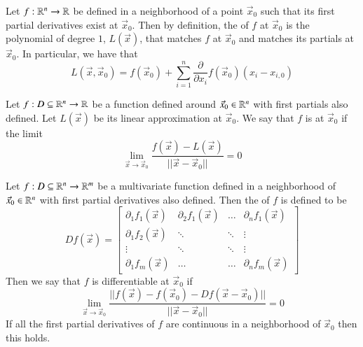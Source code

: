 \documentclass[12pt]{report}
\begin{document}
\begin{appendices}
    \begin{defn}{}{}
        Let $f:\mathbb R^n\rightarrow \mathbb R$ be defined in a neighborhood of a point $\vec{x}_0$ such that its first partial derivatives exist at $\vec{x}_0$. Then by definition, the  of $f$ at $\vec{x}_0$ is the polynomial of degree $1$, $L(\vec{x})$, that matches $f$ at $\vec{x}_0$ and matches its partials at $\vec{x}_0$. In particular, we have that \begin{equation}
            L(\vec{x},\vec{x}_0) = f(\vec{x}_0) + \sum_{i=1}^n \frac{\partial}{\partial x_i}f(\vec{x}_0)(x_i - x_{i,0})
        \end{equation}
    \end{defn}


    \begin{defn}{}{}
        Let $f:D\subseteq \mathbb R^n\rightarrow \mathbb R$ be a function defined around $\vec{x}_0 \in \mathbb R^n$ with first partials also defined. Let $L(\vec{x})$ be its linear approximation at $\vec{x}_0$. We say that $f$ is  at $\vec{x}_0$ if the limit \begin{equation}
            \lim_{\vec{x}\rightarrow \vec{x}_0} \frac{f(\vec{x}) - L(\vec{x})}{||\vec{x}-\vec{x}_0||} = 0
        \end{equation}
    \end{defn}


    \begin{defn}{}{}
        Let $f:D\subseteq \mathbb R^n\rightarrow \mathbb R^m$ be a multivariate function defined in a neighborhood of $\vec{x}_0 \in \mathbb R^n$ with first partial derivatives also defined. Then the  of $f$ is defined to be \begin{equation}
            Df(\vec{x}) = \begin{bmatrix} \partial_1f_1(\vec{x}) & \partial_2f_1(\vec{x}) & \hdots & \partial_nf_1(\vec{x}) \\
                \partial_1f_2(\vec{x}) & \ddots & \ddots & \vdots \\
                \vdots & \ddots & \ddots & \vdots \\
                \partial_1f_m(\vec{x}) & \hdots & \hdots & \partial_nf_m(\vec{x})
            \end{bmatrix}
        \end{equation}
        Then we say that $f$ is differentiable at $\vec{x}_0$ if \begin{equation}
            \lim_{\vec{x}\rightarrow \vec{x}_0}\frac{||f(\vec{x}) - f(\vec{x}_0) - Df(\vec{x} - \vec{x}_0)||}{||\vec{x} - \vec{x}_0||} = 0
        \end{equation}
        If all the first partial derivatives of $f$ are continuous in a neighborhood of $\vec{x}_0$ then this holds.
    \end{defn}



\end{appendices}
\end{document}
